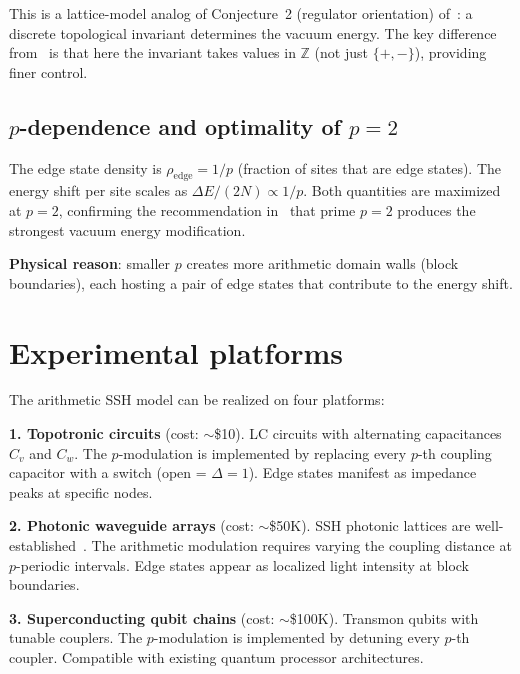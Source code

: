 \documentclass[11pt,a4paper]{article}
\begin{document}
This is a lattice-model analog of Conjecture~2
(regulator orientation) of~\cite{paper_B}: a discrete
topological invariant determines the vacuum energy.
The key difference from~\cite{paper_B} is that here the
invariant takes values in $\mathbb{Z}$ (not just $\{+, -\}$),
providing finer control.

\subsection{$p$-dependence and optimality of $p = 2$}

The edge state density is $\rho_{\mathrm{edge}} = 1/p$
(fraction of sites that are edge states).
The energy shift per site scales as
$\Delta E / (2N) \propto 1/p$.
Both quantities are maximized at $p = 2$, confirming the
recommendation in~\cite{paper_A} that prime $p = 2$ produces
the strongest vacuum energy modification.

\textbf{Physical reason}: smaller $p$ creates more arithmetic
domain walls (block boundaries), each hosting a pair of edge
states that contribute to the energy shift.

\section{Experimental platforms}
\label{sec:experiment}

The arithmetic SSH model can be realized on four platforms:

\textbf{1. Topotronic circuits} (cost: $\sim$\$10).
LC circuits with alternating capacitances $C_v$ and $C_w$.
The $p$-modulation is implemented by replacing every $p$-th
coupling capacitor with a switch (open = $\Delta = 1$).
Edge states manifest as impedance peaks at specific nodes.

\textbf{2. Photonic waveguide arrays} (cost: $\sim$\$50K).
SSH photonic lattices are well-established~\cite{photonic_ssh}.
The arithmetic modulation requires varying the coupling distance
at $p$-periodic intervals. Edge states appear as localized
light intensity at block boundaries.

\textbf{3. Superconducting qubit chains} (cost: $\sim$\$100K).
Transmon qubits with tunable couplers. The $p$-modulation is
implemented by detuning every $p$-th coupler.
Compatible with existing quantum processor architectures.
\end{document}
